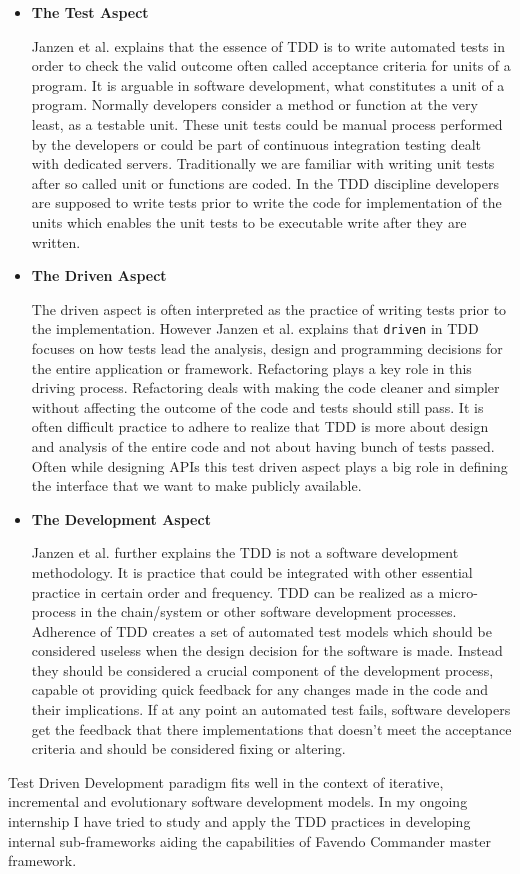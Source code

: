 \begin{itemize}
	\item \textbf{The Test Aspect}
	\par Janzen et al. \cite{janzen2005test} explains that the essence of TDD is to write automated tests in order to check the valid outcome often called acceptance criteria for units of a program. It is arguable in software development, what constitutes a unit of a program. Normally developers consider a method or function at the very least, as a testable unit. These unit tests could be manual process performed by the developers or could be part of continuous integration testing dealt with dedicated servers. Traditionally we are familiar with writing unit tests after so called unit or functions are coded. In the TDD discipline developers are supposed to write tests prior to write the code for implementation of the units which enables the unit tests to be executable write after they are written.
	\item \textbf{The Driven Aspect}
	\par The driven aspect is often interpreted as the practice of writing tests prior to the implementation. However Janzen et al. \cite{janzen2005test}  explains that \texttt{driven} in TDD focuses on how tests lead the analysis, design and programming decisions for the entire application or framework. Refactoring plays a key role in this driving process. Refactoring deals with making the code cleaner and simpler without affecting the outcome of the code and tests should still pass. It is often difficult practice to adhere to realize that TDD is more about design and analysis of the entire code and not about having bunch of tests passed. Often while designing APIs this test driven aspect plays a big role in defining the interface that we want to make publicly available.
	\item \textbf{The Development Aspect}
	\par Janzen et al. \cite{janzen2005test} further explains the TDD is not a software development methodology. It is practice that could be integrated with other essential practice in certain order and frequency. TDD can be realized as a micro-process in the chain/system or other software development processes. Adherence of TDD creates a set of automated test models which should be considered useless when the design decision for the software is made. Instead they should be considered a crucial component of the development process, capable ot providing quick feedback for any changes made in the code and their implications. If at any point an automated test fails, software developers get the feedback that there implementations that doesn't meet the acceptance criteria and should be considered fixing or altering.
\end{itemize}
Test Driven Development paradigm fits well in the context of iterative, incremental and evolutionary software development models. In my ongoing internship I have tried to study and apply the TDD practices in developing internal sub-frameworks aiding the capabilities of Favendo Commander master framework.

